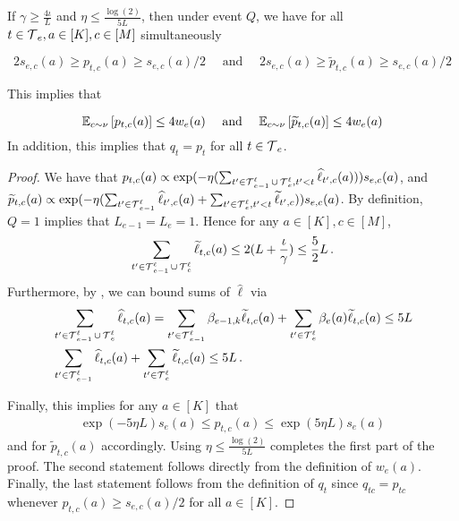 \begin{lemma}
\label{lem:s_smaller_p_smaller_2s}
    If $\gamma \geq \frac{4 \iota}{L}$ and $\eta \le \frac{\log (2)}{5 L}$, then under event $Q$, we have for all $t \in \operatorname{\mathcal{T}}_e, a \in[K], c \in[M]$ simultaneously

$$
2 s_{e,c}(a) \geq p_{t,c}(a) \geq s_{e,c}(a) / 2 \quad \text { and } \quad 2 s_{e,c}(a) \geq \widetilde{p}_{t,c}(a) \geq s_{e,c}(a) / 2
$$


This implies that

$$
\mathbb{E}_{c \sim \nu}\left[p_{t,c}(a)\right] \le 4 w_{e}(a) \quad \text { and } \quad \mathbb{E}_{c \sim \nu}\left[\widetilde{p}_{t,c}(a)\right] \le 4 w_{e}(a)
$$
In addition, this implies that $q_t=p_t$ for all $t \in \operatorname{\mathcal{T}}_e$.

\end{lemma}
\begin{proof}
We have that $p_{t,c}(a) \propto \exp(-\eta(\sum_{t'\in\operatorname{\mathcal{T}}^{\ell}_{e-1} \cup \operatorname{\mathcal{T}}^{\ell}_e,t'<t} \widehat{\ell}_{t',c}(a))) s_{e,c}(a)$, and $\widetilde{p}_{t,c}(a) \propto \exp( -\eta( \sum_{t'\in\operatorname{\mathcal{T}}^{\ell}_{e-1}} \widehat{\ell}_{t',c}(a) + \sum_{t'\in\operatorname{\mathcal{T}}^{\ell}_e,t'<t} \widetilde{\ell}_{t',c}))s_{e,c}(a)$.
By definition, $Q=1$ implies that $L_{e-1}=L_e=1$. Hence for any $a\in[K],c\in[M]$,
\begin{align*}
    \sum_{t'\in\operatorname{\mathcal{T}}^{\ell}_{e-1}\cup\operatorname{\mathcal{T}}^{\ell}_{e}}\widetilde{\ell}_{t,c}(a) \le 2(L+\frac{\iota}{\gamma} )\le \frac{5}{2}L\,.
\end{align*}
Furthermore, by , we can bound sums of $\widehat{\ell}$ via
\begin{align*}
    &\sum_{t'\in\operatorname{\mathcal{T}}^{\ell}_{e-1}\cup\operatorname{\mathcal{T}}^{\ell}_{e}}\widehat{\ell}_{t,c}(a) =\sum_{t'\in\operatorname{\mathcal{T}}^{\ell}_{e-1}}\beta_{e-1,k}\widetilde{\ell}_{t,c}(a)+\sum_{t'\in\operatorname{\mathcal{T}}^{\ell}_{e}}\beta_{e}(a)\widetilde{\ell}_{t,c}(a) \le 5L\\
    &\sum_{t'\in\operatorname{\mathcal{T}}^{\ell}_{e-1}}\widehat{\ell}_{t,c}(a)+\sum_{t'\in\operatorname{\mathcal{T}}^{\ell}_{e}}\widetilde{\ell}_{t,c}(a) \le 5L\,.
\end{align*}

Finally, this implies for any $a \in [K]$ that
\begin{align*}
    \exp\left(-5\eta L \right)s_{e}(a)\le p_{t,c}(a)\le \exp\left(5\eta L\right) s_{e}(a)
\end{align*}
and for $\widetilde{p}_{t,c}(a)$ accordingly.
Using $\eta\le \frac{\log(2)}{5L}$ completes the first part of the proof.
The second statement follows directly from the definition of $w_{e}(a)$. Finally, the last statement follows from the definition of $q_t$ since $q_{tc} = p_{tc}$ whenever $p_{t,c}(a) \geq s_{e,c}(a)/2$ for all $a \in[K]$. 
\end{proof}

